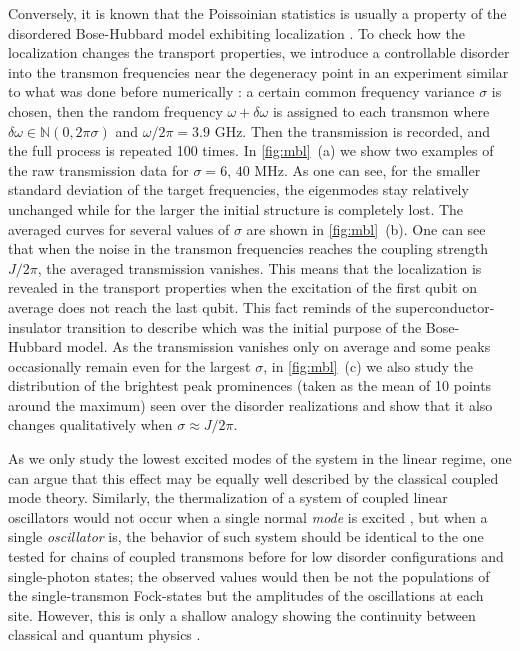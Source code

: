 \documentclass[%
 aps, pra,
 amsmath,amssymb,
 reprint,%
superscriptaddress
]{revtex4-2}
\begin{document}
Conversely, it is known that the Poissoinian statistics is usually a property of the disordered Bose-Hubbard model exhibiting localization \cite{roushan2017spectroscopic, Yan2019,Ye2019}. To check how the localization changes the transport properties, we introduce a controllable disorder into the transmon frequencies near the degeneracy point in an experiment similar to what was done before numerically \cite{orell2019probing}: a certain common frequency variance $\sigma$ is chosen, then the random frequency $\omega + \delta \omega$ is assigned to each transmon where $\delta\omega \in \mathbb N(0,2\pi\sigma)$ and $\omega/2\pi = 3.9$ GHz. Then the transmission is recorded, and the full process is repeated 100 times. 
In \autoref{fig:mbl}~(a) we show two examples of the raw transmission data for  $\sigma = 6,\, 40$ MHz. As one can see, for the smaller standard deviation of the target frequencies, the eigenmodes stay relatively unchanged while for the larger the initial structure is completely lost. The averaged curves for several values of $\sigma$ are shown in \autoref{fig:mbl}~(b). One can see that when the noise in the transmon frequencies reaches the coupling strength $J/2\pi$, the averaged transmission vanishes. This means that the localization is revealed in the transport properties when the excitation of the first qubit on average does not reach the last qubit. This fact reminds of the superconductor-insulator transition \cite{bruder1993superconductor} to describe which was the initial purpose of the Bose-Hubbard model. As the transmission vanishes only on average and some peaks occasionally remain even for the largest $\sigma$, in \autoref{fig:mbl}~(c) we also study the distribution of the brightest peak prominences (taken as the mean of 10 points around the maximum) seen over the disorder realizations and show that it also changes qualitatively when $\sigma \approx J/2\pi$.  

As we only study the lowest excited modes of the system in the linear regime, one can argue that this effect may be equally well described by the classical coupled mode theory. Similarly, the thermalization of a system of coupled linear oscillators would not occur when a single normal \textit{mode} is excited \cite{deutsch2018eigenstate}, but when a single \textit{oscillator} is, the behavior of such system should be identical to the one tested for chains of coupled transmons before \cite{Yan2019, ma2019dissipatively} for low disorder configurations and single-photon states; the observed values would then be not the populations of the single-transmon Fock-states but the amplitudes of the oscillations at each site. However, this is only a shallow analogy showing the continuity between classical and quantum physics \cite{park2012classical}.
\end{document}
